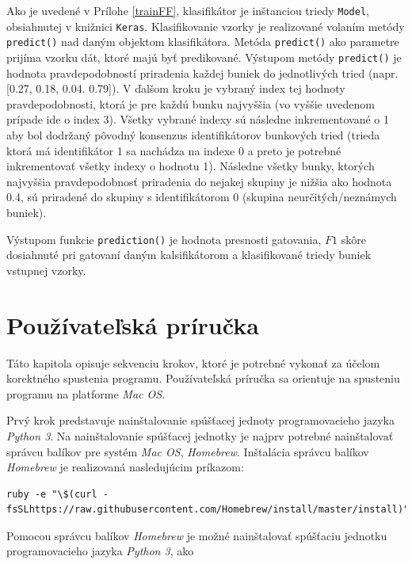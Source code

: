 Ako je uvedené v Prílohe \ref{trainFF}, klasifikátor je inštanciou triedy \texttt{Model}, obsiahnutej v knižnici \texttt{Keras}. Klasifikovanie vzorky je realizované volaním metódy \texttt{predict()} nad daným objektom klasifikátora. Metóda \texttt{predict()} ako parametre prijíma vzorku dát, ktoré majú byť predikované. Výstupom metódy \texttt{predict()} je hodnota pravdepodobností priradenia každej buniek do jednotlivých tried (napr. [0.27, 0.18, 0.04. 0.79]). V ďalšom kroku je vybraný index tej hodnoty pravdepodobnosti, ktorá je pre každú bunku najvyššia (vo vyššie uvedenom prípade ide o index 3). Všetky vybrané indexy sú následne inkrementované o 1 aby bol dodržaný pôvodný konsenzus identifikátorov bunkových tried (trieda ktorá má identifikátor 1 sa nachádza na indexe 0 a preto je potrebné inkrementovať všetky indexy o hodnotu 1). Následne všetky bunky, ktorých najvyššia pravdepodobnosť priradenia do nejakej skupiny je nižšia ako hodnota 0.4, sú priradené do skupiny s identifikátorom 0 (skupina neurčitých/neznámych buniek).

Výstupom funkcie \texttt{prediction()} je hodnota presnosti gatovania, $F1$ skôre dosiahnuté pri gatovaní daným kalsifikátorom a klasifikované triedy buniek vstupnej vzorky.

\chapter{Používateľská príručka}

Táto kapitola opisuje sekvenciu krokov, ktoré je potrebné vykonať za účelom korektného spustenia programu. Používateľská príručka sa orientuje na spusteniu programu na platforme \textit{Mac OS}.

Prvý krok predstavuje nainštalovanie spúšťacej jednoty programovacieho jazyka \textit{Python 3}. Na nainštalovanie spúšťacej jednotky je najprv potrebné nainštalovať správcu balíkov pre systém \textit{Mac OS}, \textit{Homebrew}. Inštalácia správcu balíkov \textit{Homebrew} je realizovaná nasledujúcim príkazom:

\begin{Verbatim}[breaklines=true, breakanywhere=true]
ruby -e "\$(curl -fsSLhttps://raw.githubusercontent.com/Homebrew/install/master/install)"
\end{Verbatim}

Pomocou správcu balíkov \textit{Homebrew} je možné nainštalovať spúšťaciu jednotku programovacieho jazyka \textit{Python 3}, ako

